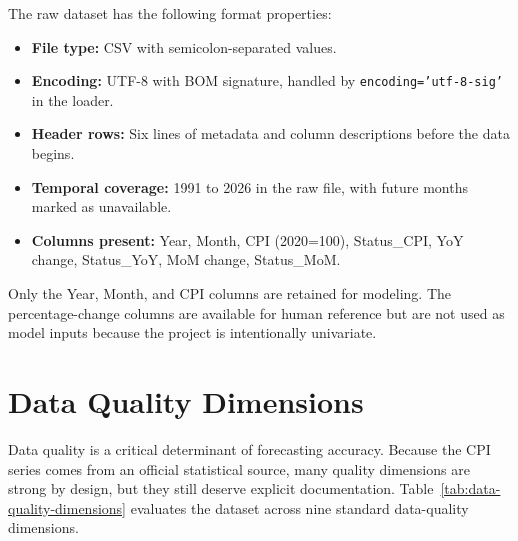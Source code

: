 The raw dataset has the following format properties:

\begin{itemize}
	\item \textbf{File type:} CSV with semicolon-separated values.
	\item \textbf{Encoding:} UTF-8 with BOM signature, handled by \texttt{encoding='utf-8-sig'} in the loader.
	\item \textbf{Header rows:} Six lines of metadata and column descriptions before the data begins.
	\item \textbf{Temporal coverage:} 1991 to 2026 in the raw file, with future months marked as unavailable.
	\item \textbf{Columns present:} Year, Month, CPI (2020=100), Status\_CPI, YoY change, Status\_YoY, MoM change, Status\_MoM.
\end{itemize}

Only the Year, Month, and CPI columns are retained for modeling. The percentage-change columns are available for human reference but are not used as model inputs because the project is intentionally univariate.

\section{Data Quality Dimensions}

Data quality is a critical determinant of forecasting accuracy. Because the CPI series comes from an official statistical source, many quality dimensions are strong by design, but they still deserve explicit documentation. Table~\ref{tab:data-quality-dimensions} evaluates the dataset across nine standard data-quality dimensions.


